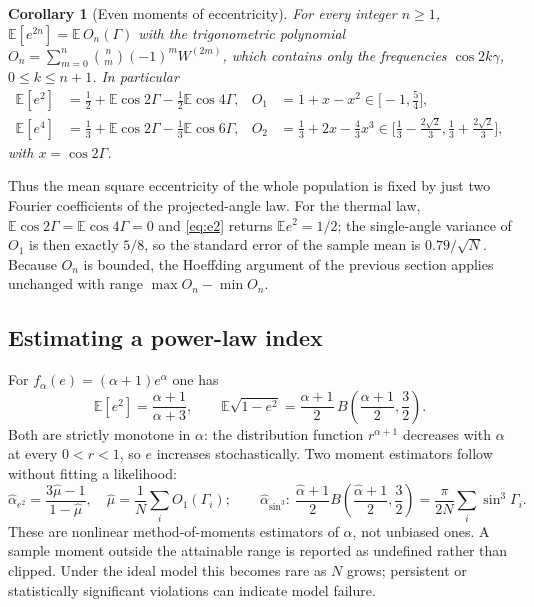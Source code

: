\documentclass[11pt,a4paper]{article}
\newtheorem{corollary}[theorem]{Corollary}
\theoremstyle{remark}\newtheorem{remark}[theorem]{Remark}
\newcommand{\E}{\mathbb E}
\begin{document}
\begin{corollary}[Even moments of eccentricity]\label{cor:even}
For every integer $n\ge1$, $\E[e^{2n}]=\E\,O_n(\Gamma)$ with the trigonometric polynomial $O_n=\sum_{m=0}^n\binom nm(-1)^mW^{(2m)}$, which contains only the frequencies $\cos2k\gamma$, $0\le k\le n+1$. In particular
\begin{align}
\E[e^2]&=\tfrac12+\E\cos2\Gamma-\tfrac12\E\cos4\Gamma,
&O_1&=1+x-x^2\in\big[-1,\tfrac54\big],\label{eq:e2}\\
\E[e^4]&=\tfrac13+\E\cos2\Gamma-\tfrac13\E\cos6\Gamma,
&O_2&=\tfrac13+2x-\tfrac43x^3\in\big[\tfrac13-\tfrac{2\sqrt2}{3},\tfrac13+\tfrac{2\sqrt2}{3}\big],\label{eq:e4}
\end{align}
with $x=\cos2\Gamma$.
\end{corollary}

Thus the mean square eccentricity of the whole population is fixed by just two Fourier coefficients of the projected-angle law. For the thermal law, $\E\cos2\Gamma=\E\cos4\Gamma=0$ and \eqref{eq:e2} returns $\E e^2=1/2$; the single-angle variance of $O_1$ is then exactly $5/8$, so the standard error of the sample mean is $0.79/\sqrt N$. Because $O_n$ is bounded, the Hoeffding argument of the previous section applies unchanged with range $\max O_n-\min O_n$.

\subsection{Estimating a power-law index}

For $f_\alpha(e)=(\alpha+1)e^\alpha$ one has
\begin{equation}\label{eq:pl-moments}
\E[e^2]=\frac{\alpha+1}{\alpha+3},\qquad
\E\sqrt{1-e^2}=\frac{\alpha+1}{2}\,B\!\left(\frac{\alpha+1}{2},\frac32\right).
\end{equation}
Both are strictly monotone in $\alpha$: the distribution function $r^{\alpha+1}$ decreases with $\alpha$ at every $0<r<1$, so $e$ increases stochastically. Two moment estimators follow without fitting a likelihood:
\begin{equation}\label{eq:alphahat}
\widehat\alpha_{e^2}=\frac{3\widehat\mu-1}{1-\widehat\mu},\quad \widehat\mu=\frac1N\sum_iO_1(\Gamma_i);
\qquad
\widehat\alpha_{\sin^3}:\ \frac{\widehat\alpha+1}{2}B\!\left(\frac{\widehat\alpha+1}{2},\frac32\right)=\frac{\pi}{2N}\sum_i\sin^3\Gamma_i.
\end{equation}
These are nonlinear method-of-moments estimators of $\alpha$, not unbiased ones. A sample moment outside the attainable range is reported as undefined rather than clipped. Under the ideal model this becomes rare as $N$ grows; persistent or statistically significant violations can indicate model failure.
\end{document}
